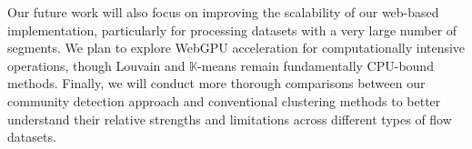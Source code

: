 Our future work will also focus on improving the scalability of our web-based implementation, particularly for processing datasets with a very large number of segments. We plan to explore WebGPU acceleration for computationally intensive operations, though Louvain and $\mathbb{K}$-means remain fundamentally CPU-bound methods. Finally, we will conduct more thorough comparisons between our community detection approach and conventional clustering methods to better understand their relative strengths and limitations across different types of flow datasets. 
